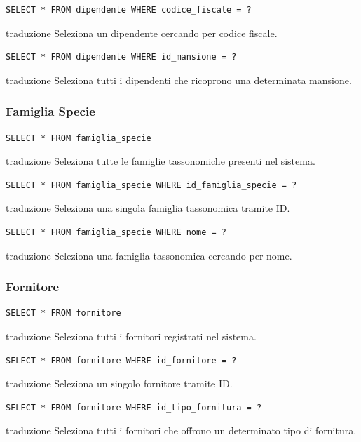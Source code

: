 \documentclass[12pt,a4paper]{report}
\begin{document}
\begin{lstlisting}[style=sqlstyle]
SELECT * FROM dipendente WHERE codice_fiscale = ?
\end{lstlisting}
traduzione {Seleziona un dipendente cercando per codice fiscale.}

\begin{lstlisting}[style=sqlstyle]
SELECT * FROM dipendente WHERE id_mansione = ?
\end{lstlisting}
traduzione {Seleziona tutti i dipendenti che ricoprono una determinata mansione.}

\subsubsection*{Famiglia Specie}
\begin{lstlisting}[style=sqlstyle]
SELECT * FROM famiglia_specie
\end{lstlisting}
traduzione {Seleziona tutte le famiglie tassonomiche presenti nel sistema.}

\begin{lstlisting}[style=sqlstyle]
SELECT * FROM famiglia_specie WHERE id_famiglia_specie = ?
\end{lstlisting}
traduzione {Seleziona una singola famiglia tassonomica tramite ID.}

\begin{lstlisting}[style=sqlstyle]
SELECT * FROM famiglia_specie WHERE nome = ?
\end{lstlisting}
traduzione {Seleziona una famiglia tassonomica cercando per nome.}

\subsubsection*{Fornitore}
\begin{lstlisting}[style=sqlstyle]
SELECT * FROM fornitore
\end{lstlisting}
traduzione {Seleziona tutti i fornitori registrati nel sistema.}

\begin{lstlisting}[style=sqlstyle]
SELECT * FROM fornitore WHERE id_fornitore = ?
\end{lstlisting}
traduzione {Seleziona un singolo fornitore tramite ID.}

\begin{lstlisting}[style=sqlstyle]
SELECT * FROM fornitore WHERE id_tipo_fornitura = ?
\end{lstlisting}
traduzione {Seleziona tutti i fornitori che offrono un determinato tipo di fornitura.}
\end{document}
